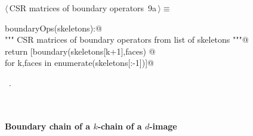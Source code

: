 \documentclass[11pt,oneside]{article}	%
\begin{document}
\begin{flushleft} \small
\begin{minipage}{\linewidth} \label{scrap13}
\protect{}$\langle\,$CSR matrices of boundary operators\nobreak\ {\footnotesize 9a}$\,\rangle\equiv$
\vspace{-1ex}
\begin{list}{}{} \item
\mbox{}\verb@def boundaryOps(skeletons):@\\
\mbox{}\verb@   """ CSR matrices of boundary operators from list of skeletons """@\\
\mbox{}\verb@   return [boundary(skeletons[k+1],faces) @\\
\mbox{}\verb@      for k,faces in enumerate(skeletons[:-1])]@\\
\mbox{}\verb@@{\NWsep}
\end{list}
\vspace{-1ex}
\footnotesize\addtolength{\baselineskip}{-1ex}
\begin{list}{}{\setlength{\itemsep}{-\parsep}\setlength{\itemindent}{-\leftmargin}}
\item \NWtxtMacroRefIn\ .
\end{list}
\end{minipage}\\[4ex]
\end{flushleft}


\paragraph{Boundary chain of a $k$-chain of a $d$-image}
\end{document}
